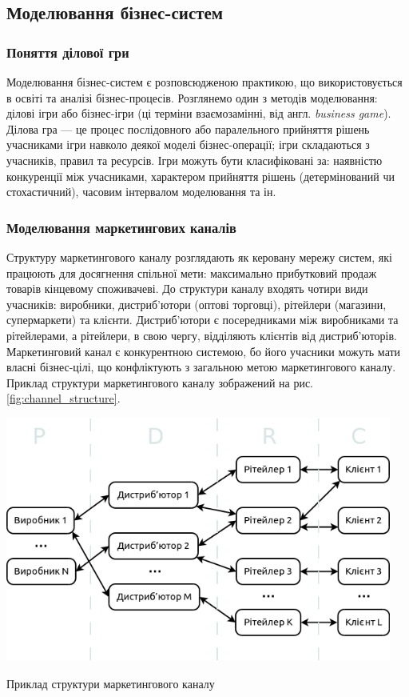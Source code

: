     \subsection{Моделювання бізнес-систем}
        \subsubsection{Поняття ділової гри}
Моделювання бізнес-систем є розповсюдженою практикою, що використовується в освіті та аналізі бізнес-процесів. Розглянемо один з методів моделювання: ділові ігри або бізнес-ігри (ці терміни взаємозамінні, від англ. {\it business game}). Ділова гра --- це процес послідовного або паралельного прийняття рішень учасниками ігри навколо деякої моделі бізнес-операції; ігри складаються з учасників, правил та ресурсів\cite{bg1, bg2}. Ігри можуть бути класифіковані за\cite{bg3}: наявністю конкуренції між учасниками, характером прийняття рішень (детермінований чи стохастичний), часовим інтервалом моделювання та ін.
        
        \subsubsection{Моделювання маркетингових каналів}
Структуру маркетингового каналу розглядають як керовану мережу систем, які працюють для досягнення спільної мети\cite{stern}: 
максимально прибутковий продаж товарів кінцевому споживачеві. До структури каналу входять чотири види учасників: виробники, дистриб’ютори (оптові торговці), рітейлери (магазини, супермаркети) та клієнти. Дистриб’ютори є посередниками між виробниками та рітейлерами, а рітейлери, в свою чергу, відділяють клієнтів від дистриб’юторів. Маркетинговий канал є конкурентною системою, бо його учасники можуть мати власні бізнес-цілі, що конфліктують з загальною метою маркетингового каналу. Приклад структури маркетингового каналу зображений на рис. \ref{fig:channel_structure}.

            \begin{stdfigure}
                \includegraphics[width=5in]{images/channel_structure.png}
                \caption{Приклад структури маркетингового каналу}
                \label{fig:channel_structure}
            \end{stdfigure}    

